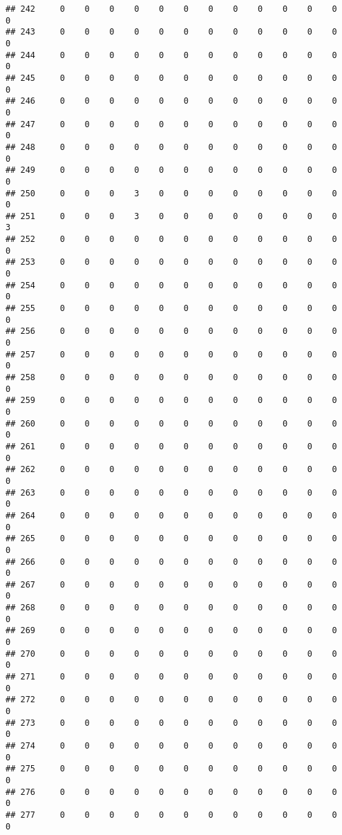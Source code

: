 \documentclass[]{article}
\begin{document}
\begin{verbatim}
## 242     0    0    0    0    0    0    0    0    0    0    0    0    0
## 243     0    0    0    0    0    0    0    0    0    0    0    0    0
## 244     0    0    0    0    0    0    0    0    0    0    0    0    0
## 245     0    0    0    0    0    0    0    0    0    0    0    0    0
## 246     0    0    0    0    0    0    0    0    0    0    0    0    0
## 247     0    0    0    0    0    0    0    0    0    0    0    0    0
## 248     0    0    0    0    0    0    0    0    0    0    0    0    0
## 249     0    0    0    0    0    0    0    0    0    0    0    0    0
## 250     0    0    0    3    0    0    0    0    0    0    0    0    0
## 251     0    0    0    3    0    0    0    0    0    0    0    0    3
## 252     0    0    0    0    0    0    0    0    0    0    0    0    0
## 253     0    0    0    0    0    0    0    0    0    0    0    0    0
## 254     0    0    0    0    0    0    0    0    0    0    0    0    0
## 255     0    0    0    0    0    0    0    0    0    0    0    0    0
## 256     0    0    0    0    0    0    0    0    0    0    0    0    0
## 257     0    0    0    0    0    0    0    0    0    0    0    0    0
## 258     0    0    0    0    0    0    0    0    0    0    0    0    0
## 259     0    0    0    0    0    0    0    0    0    0    0    0    0
## 260     0    0    0    0    0    0    0    0    0    0    0    0    0
## 261     0    0    0    0    0    0    0    0    0    0    0    0    0
## 262     0    0    0    0    0    0    0    0    0    0    0    0    0
## 263     0    0    0    0    0    0    0    0    0    0    0    0    0
## 264     0    0    0    0    0    0    0    0    0    0    0    0    0
## 265     0    0    0    0    0    0    0    0    0    0    0    0    0
## 266     0    0    0    0    0    0    0    0    0    0    0    0    0
## 267     0    0    0    0    0    0    0    0    0    0    0    0    0
## 268     0    0    0    0    0    0    0    0    0    0    0    0    0
## 269     0    0    0    0    0    0    0    0    0    0    0    0    0
## 270     0    0    0    0    0    0    0    0    0    0    0    0    0
## 271     0    0    0    0    0    0    0    0    0    0    0    0    0
## 272     0    0    0    0    0    0    0    0    0    0    0    0    0
## 273     0    0    0    0    0    0    0    0    0    0    0    0    0
## 274     0    0    0    0    0    0    0    0    0    0    0    0    0
## 275     0    0    0    0    0    0    0    0    0    0    0    0    0
## 276     0    0    0    0    0    0    0    0    0    0    0    0    0
## 277     0    0    0    0    0    0    0    0    0    0    0    0    0

\end{verbatim}
\end{document}
